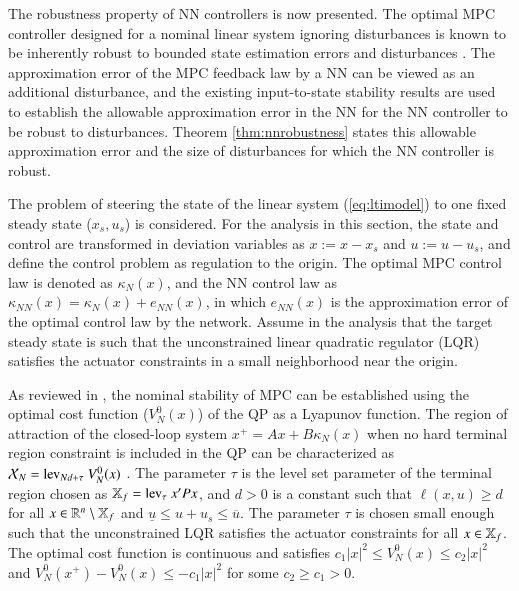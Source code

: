 \documentclass[preprint,5p, twocolumn, authoryear]{elsarticle}
\begin{document}
The robustness property of NN controllers 
is now presented. The optimal MPC controller
designed for a nominal linear system ignoring disturbances
is known to be inherently robust to bounded state 
estimation errors and disturbances
\citep*{heath:wills:2005, pannocchia:rawlings:wright:2011}. 
The approximation
error of the MPC feedback law by a NN can be viewed 
as an additional disturbance, and the existing
input-to-state stability
results \citep*{sontag:wang:1995} are used to establish the 
allowable approximation error in the NN for 
the NN controller to be robust to disturbances. 
Theorem \ref{thm:nnrobustness} states this 
allowable approximation error and the size 
of disturbances for which the NN controller is robust.

The problem of steering the state of the linear 
system (\ref{eq:ltimodel}) 
to one fixed steady state ($x_s, u_s$) is considered. 
For the analysis in this section, 
the state and control are transformed in deviation variables 
as $x := x - x_s$ and $u := u -u_s$,
and define the control problem as regulation to the origin.
The optimal MPC control law is denoted as $\kappa_N(x)$, 
and the NN control law as
$\kappa_{NN}(x) = \kappa_N(x) + e_{NN}(x)$, in which 
$e_{NN}(x)$ is the approximation error 
of the optimal control law by the network. Assume 
in the analysis that the target steady state 
is such that the unconstrained linear quadratic regulator (LQR)
satisfies the actuator constraints 
in a small neighborhood near the origin. 

As reviewed in \cite*{mayne:rawlings:rao:scokaert:2000},
the nominal stability of MPC can be established
using the optimal cost function ($V_N^0(x)$) of the QP
as a Lyapunov function.
The region of attraction of the closed-loop system 
$x^+ = Ax + B\kappa_N(x)$ when no hard terminal region 
constraint is included in the QP
can be characterized as $\mathcal{X}_N = \textnormal{lev}_{Nd + \tau} \
V_N^0(x)$ \citep*{limon:alamo:salas:camacho:2006}.
The parameter $\tau$ is the level set
parameter of the terminal region chosen as
$\mathbb{X}_f = \textnormal{lev}_{\tau} \ x'Px$, and $d > 0$
is a constant such that $\ell(x, u) \geq d$ for all 
$x \in \mathbb{R}^n \setminus \mathbb{X}_f$ and 
$\underline{u} \leq u+u_s \leq \overline{u}$.
The parameter $\tau$ is chosen small enough such that
the unconstrained LQR satisfies the actuator constraints 
for all $x \in \mathbb{X}_f$. The optimal cost 
function is continuous and satisfies 
$c_1\vert x \vert^2 \leq V_N^0(x) \leq c_2\vert x \vert^2$
and $V_N^0(x^+) - V_N^0(x) \leq -c_1\vert x \vert^2$ 
for some $c_2 \geq c_1 > 0$.
\end{document}
